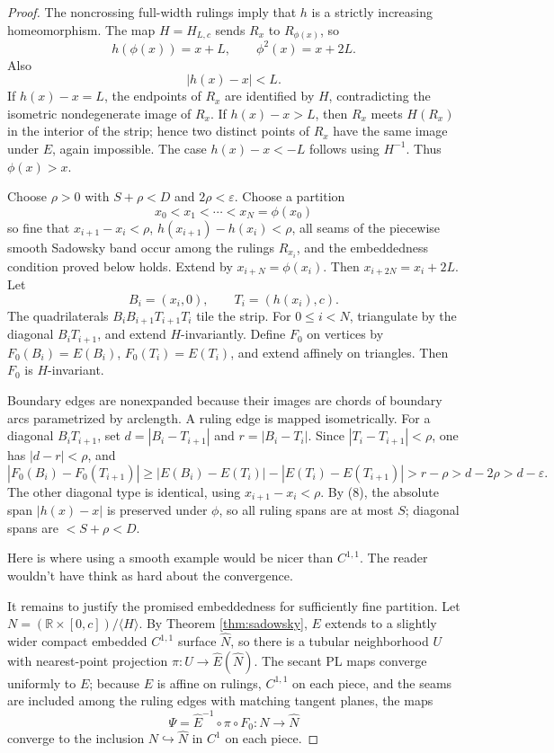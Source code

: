 \documentclass[12pt]{article}
\newcommand{\R}{\mathbb R}
\theoremstyle{plain}
\newcommand{\review}[1]{\begin{reviewbox}#1\end{reviewbox}}
\begin{document}
\begin{proof}
The noncrossing full-width rulings imply that \(h\) is a strictly increasing
homeomorphism.  The map \(H=H_{L,c}\) sends \(R_x\) to
\(R_{\phi(x)}\), so
\[
h(\phi(x))=x+L,\qquad \phi^2(x)=x+2L. \tag{8}
\]
Also
\[
|h(x)-x|<L. \tag{9}
\]
If \(h(x)-x=L\), the endpoints of \(R_x\) are identified by \(H\), contradicting
the isometric nondegenerate image of \(R_x\).  If \(h(x)-x>L\), then \(R_x\)
meets \(H(R_x)\) in the interior of the strip; hence two distinct points of
\(R_x\) have the same image under \(E\), again impossible.  The case
\(h(x)-x<-L\) follows using \(H^{-1}\).  Thus \(\phi(x)>x\).

Choose \(\rho>0\) with \(S+\rho<D\) and \(2\rho<\varepsilon\).  Choose a
partition
\[
x_0<x_1<\cdots<x_N=\phi(x_0)
\]
so fine that \(x_{i+1}-x_i<\rho\), \(h(x_{i+1})-h(x_i)<\rho\), all seams of the
piecewise smooth Sadowsky band occur among the rulings \(R_{x_i}\), and the
embeddedness condition proved below holds.  Extend by \(x_{i+N}=\phi(x_i)\).
Then \(x_{i+2N}=x_i+2L\).  Let
\[
B_i=(x_i,0),\qquad T_i=(h(x_i),c).
\]
The quadrilaterals \(B_iB_{i+1}T_{i+1}T_i\) tile the strip.  For
\(0\le i<N\), triangulate by the diagonal \(B_iT_{i+1}\), and extend
\(H\)-invariantly.  Define \(F_0\) on vertices by \(F_0(B_i)=E(B_i)\),
\(F_0(T_i)=E(T_i)\), and extend affinely on triangles.  Then \(F_0\) is
\(H\)-invariant.

Boundary edges are nonexpanded because their images are chords of boundary
arcs parametrized by arclength.  A ruling edge is mapped isometrically.  For a
diagonal \(B_iT_{i+1}\), set
\(d=|B_i-T_{i+1}|\) and \(r=|B_i-T_i|\).  Since
\(|T_i-T_{i+1}|<\rho\), one has \(|d-r|<\rho\), and
\[
|F_0(B_i)-F_0(T_{i+1})|
\ge |E(B_i)-E(T_i)|-|E(T_i)-E(T_{i+1})|
>r-\rho>d-2\rho>d-\varepsilon.
\]
The other diagonal type is identical, using \(x_{i+1}-x_i<\rho\).  By (8),
the absolute span \(|h(x)-x|\) is preserved under \(\phi\), so all ruling spans
are at most \(S\); diagonal spans are \(<S+\rho<D\).


\review{Here is where using a smooth example would be nicer than $C^{1,1}$.  The reader wouldn't have think as hard about the convergence.}

It remains to justify the promised embeddedness for sufficiently fine
partition.  Let
\(N=(\R\times[0,c])/\langle H\rangle\).  By Theorem \ref{thm:sadowsky}, \(E\)
extends to a slightly wider compact embedded \(C^{1,1}\) surface
\(\widehat N\), so there is a tubular neighborhood \(U\) with nearest-point
projection \(\pi:U\to \widehat E(\widehat N)\).  The secant PL maps converge
uniformly to \(E\); because \(E\) is affine on rulings, \(C^{1,1}\) on each
piece, and the seams are included among the ruling edges with matching tangent
planes, the maps
\[
\Psi=\widehat E^{-1}\circ\pi\circ F_0:N\to\widehat N
\]
converge to the inclusion \(N\hookrightarrow\widehat N\) in \(C^1\) on each
piece.


\end{proof}
\end{document}
